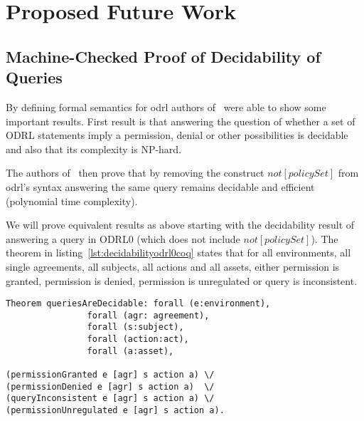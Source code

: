 \chapter{Proposed Future Work}



\section{Machine-Checked Proof of Decidability of Queries}

By defining formal semantics for \ac{odrl} authors of~\cite{pucella2006} were able to show some important results. First result is that answering the question of whether a set of ODRL statements imply a permission, denial or other possibilities is decidable and also that its complexity is NP-hard.

The authors of~\cite{pucella2006} then prove that by removing the construct $not[policySet]$ from \ac{odrl}'s syntax answering the same query remains decidable and efficient (polynomial time complexity). 

We will prove equivalent results as above starting with the decidability result of answering a query in ODRL0 (which does not include $not[policySet]$). The theorem in listing~\ref{lst:decidabilityodrl0coq} states that for all environments, all single agreements, all subjects, all actions and all assets, either permission is granted, permission is denied, permission is unregulated or query is inconsistent. 

\begin{minipage}[c]{0.95\textwidth}
\begin{lstlisting}
Theorem queriesAreDecidable: forall (e:environment), 
                forall (agr: agreement),
                forall (s:subject),
                forall (action:act),
                forall (a:asset),

(permissionGranted e [agr] s action a) \/
(permissionDenied e [agr] s action a)  \/
(queryInconsistent e [agr] s action a) \/
(permissionUnregulated e [agr] s action a).

\end{lstlisting}
\end{minipage}

